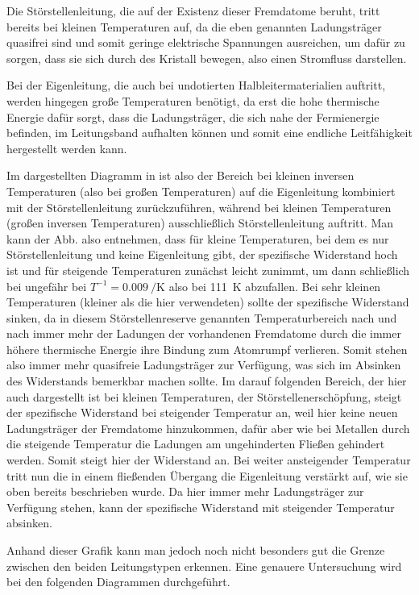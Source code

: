 Die Störstellenleitung, die auf der Existenz dieser Fremdatome beruht, tritt
bereits bei kleinen Temperaturen auf, da die eben genannten Ladungsträger
quasifrei sind und somit geringe elektrische Spannungen ausreichen, um dafür zu
sorgen, dass sie sich durch des Kristall bewegen, also einen Stromfluss
darstellen.

Bei der Eigenleitung, die auch bei undotierten Halbleitermaterialien auftritt,
werden hingegen große Temperaturen benötigt, da erst die hohe thermische Energie
dafür sorgt, dass die Ladungsträger, die sich nahe der Fermienergie befinden, im
Leitungsband aufhalten können und somit eine endliche Leitfähigkeit hergestellt
werden kann. 

Im dargestellten Diagramm in  ist also der Bereich bei kleinen
inversen Temperaturen (also bei großen Temperaturen) auf die Eigenleitung
kombiniert mit der Störstellenleitung zurückzuführen, während bei kleinen
Temperaturen (großen inversen Temperaturen) ausschließlich Störstellenleitung
auftritt. Man kann der Abb. also entnehmen, dass für kleine Temperaturen,
bei dem es nur Störstellenleitung und keine Eigenleitung gibt, der spezifische
Widerstand hoch ist und für steigende Temperaturen zunächst leicht zunimmt, um
dann schließlich bei ungefähr bei $T^{-1} = \SI{0,009}{\per\kelvin}$ also bei \SI{111}{\kelvin}
abzufallen. Bei sehr kleinen Temperaturen (kleiner als die hier verwendeten)
sollte der spezifische Widerstand sinken, da in diesem Störstellenreserve
genannten Temperaturbereich nach und nach immer mehr der Ladungen
der vorhandenen Fremdatome durch die immer höhere thermische Energie ihre
Bindung zum Atomrumpf verlieren. Somit stehen also immer mehr quasifreie
Ladungsträger zur Verfügung, was sich im Absinken des Widerstands bemerkbar
machen sollte. Im darauf folgenden Bereich, der hier auch dargestellt ist bei
kleinen Temperaturen, der Störstellenerschöpfung, steigt der spezifische
Widerstand bei steigender Temperatur an, weil hier keine neuen Ladungsträger
der Fremdatome hinzukommen, dafür aber wie bei Metallen durch die steigende
Temperatur die Ladungen am ungehinderten Fließen gehindert werden. Somit steigt
hier der Widerstand an. Bei weiter ansteigender Temperatur tritt nun die in
einem fließenden Übergang die Eigenleitung verstärkt auf, wie sie oben bereits
beschrieben wurde. Da hier immer mehr Ladungsträger zur Verfügung stehen, kann
der spezifische Widerstand mit steigender Temperatur absinken.

Anhand dieser Grafik kann man jedoch noch nicht besonders gut die Grenze
zwischen den beiden Leitungstypen erkennen. Eine genauere
Untersuchung wird bei den folgenden Diagrammen durchgeführt.

